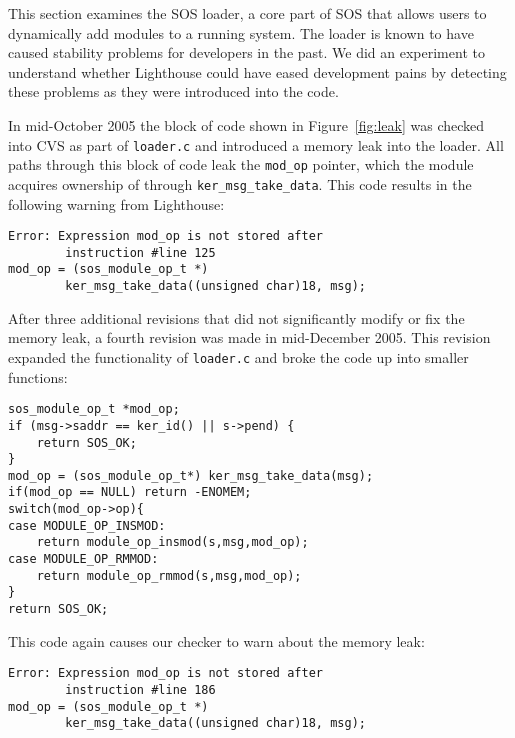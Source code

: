 This section examines the SOS loader, a core part of SOS that allows
users to dynamically add modules to a running system.  The loader is
known to have caused stability problems for developers in the past.
We did an experiment to understand whether Lighthouse 
could have eased development pains by detecting these problems as they
were introduced into the code. 

In mid-October 2005 the block of code shown in Figure~\ref{fig:leak}
was checked into CVS as part of {\tt loader.c} and introduced a memory
leak into the loader.  All paths through this block of code leak the
{\tt mod\_op} pointer, which the module acquires ownership of through
{\tt ker\_msg\_take\_data}.  This code results in the following
warning from Lighthouse:

\begin{scriptsize}
\begin{verbatim}
Error: Expression mod_op is not stored after 
        instruction #line 125
mod_op = (sos_module_op_t *)
        ker_msg_take_data((unsigned char)18, msg);
\end{verbatim}
\end{scriptsize}

After three additional revisions that did not significantly modify or
fix the memory leak, a fourth revision was made in mid-December 2005.
This revision expanded the functionality of {\tt loader.c} and broke
the code up into smaller functions:

\begin{scriptsize}
\begin{verbatim}
sos_module_op_t *mod_op;
if (msg->saddr == ker_id() || s->pend) {
    return SOS_OK;
}
mod_op = (sos_module_op_t*) ker_msg_take_data(msg);
if(mod_op == NULL) return -ENOMEM;
switch(mod_op->op){
case MODULE_OP_INSMOD:
    return module_op_insmod(s,msg,mod_op);
case MODULE_OP_RMMOD:
    return module_op_rmmod(s,msg,mod_op);
}
return SOS_OK;
\end{verbatim}
\end{scriptsize}

This code again causes our checker to warn about the memory leak:

\begin{scriptsize}
\begin{verbatim}
Error: Expression mod_op is not stored after 
        instruction #line 186
mod_op = (sos_module_op_t *)
        ker_msg_take_data((unsigned char)18, msg);
\end{verbatim}
\end{scriptsize}

